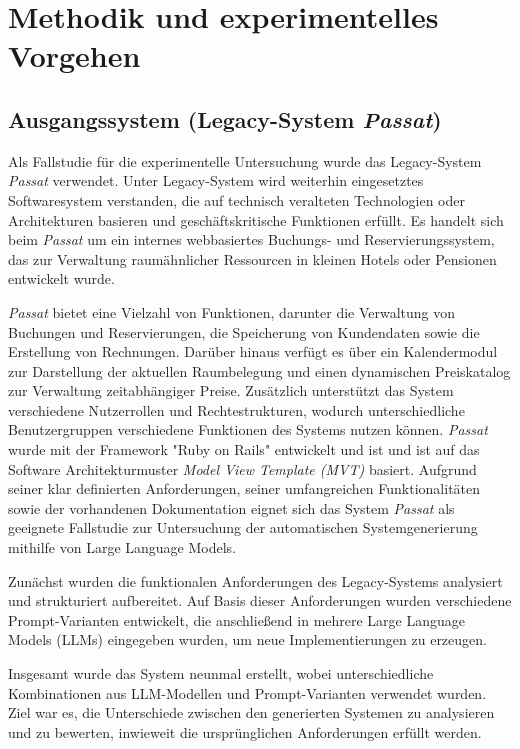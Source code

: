 \chapter{Methodik und experimentelles Vorgehen}
\label{Methode und Experemente}
\section{Ausgangssystem (Legacy-System \textit{Passat})}
Als Fallstudie für die experimentelle Untersuchung wurde das Legacy-System \textit{Passat} verwendet. Unter Legacy-System wird weiterhin eingesetztes Softwaresystem verstanden, die auf technisch veralteten Technologien oder Architekturen basieren und geschäftskritische Funktionen erfüllt. Es handelt sich beim \textit{Passat} um ein internes webbasiertes
Buchungs- und Reservierungssystem, das zur Verwaltung
raumähnlicher Ressourcen in kleinen Hotels oder Pensionen
entwickelt wurde.

\textit{Passat} bietet eine Vielzahl von Funktionen, darunter die
Verwaltung von Buchungen und Reservierungen, die Speicherung
von Kundendaten sowie die Erstellung von Rechnungen. Darüber
hinaus verfügt es über ein Kalendermodul zur Darstellung
der aktuellen Raumbelegung und einen dynamischen
Preiskatalog zur Verwaltung zeitabhängiger Preise. Zusätzlich
unterstützt das System verschiedene Nutzerrollen und
Rechtestrukturen, wodurch unterschiedliche Benutzergruppen
verschiedene Funktionen des Systems nutzen können. \textit{Passat} wurde mit der Framework "Ruby on Rails" entwickelt und ist 
 und ist auf das Software Architekturmuster \textit{Model View Template (MVT)} basiert. Aufgrund seiner klar definierten Anforderungen, seiner
umfangreichen Funktionalitäten sowie der vorhandenen
Dokumentation eignet sich das System \textit{Passat} als geeignete
Fallstudie zur Untersuchung der automatischen
Systemgenerierung mithilfe von Large Language Models.

Zunächst wurden die funktionalen Anforderungen des
Legacy-Systems analysiert und strukturiert aufbereitet. Auf Basis dieser Anforderungen wurden verschiedene
Prompt-Varianten entwickelt, die anschließend in mehrere
Large Language Models (LLMs) eingegeben wurden, um neue
Implementierungen zu erzeugen.

Insgesamt wurde das System neunmal erstellt, wobei
unterschiedliche Kombinationen aus LLM-Modellen und
Prompt-Varianten verwendet wurden. Ziel war es, die
Unterschiede zwischen den generierten Systemen zu
analysieren und zu bewerten, inwieweit die ursprünglichen
Anforderungen erfüllt werden.

